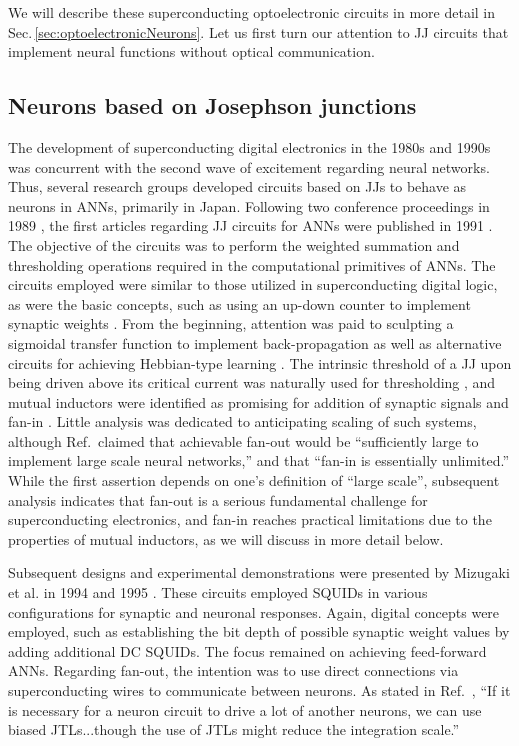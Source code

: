\documentclass[twocolumn]{article}
\newcommand{\onlinecite}[1]{\hspace{-1 ex} \nocite{#1}\citenum{#1}}
\begin{document}
We will describe these superconducting optoelectronic circuits in more detail in Sec.\,\ref{sec:optoelectronicNeurons}. Let us first turn our attention to JJ circuits that implement neural functions without optical communication.

\subsection{Neurons based on Josephson junctions}
The development of superconducting digital electronics in the 1980s and 1990s was concurrent with the second wave of excitement regarding neural networks. Thus, several research groups developed circuits based on JJs to behave as neurons in ANNs, primarily in Japan. Following two conference proceedings in 1989 \cite{ai1989,og1989}, the first articles regarding JJ circuits for ANNs were published in 1991 \cite{hago1991,hiak1991}. The objective of the circuits was to perform the weighted summation and thresholding operations required in the computational primitives of ANNs. The circuits employed were similar to those utilized in superconducting digital logic, as were the basic concepts, such as using an up-down counter to implement synaptic weights \cite{hiak1991}. From the beginning, attention was paid to sculpting a sigmoidal transfer function to implement back-propagation as well as alternative circuits for achieving Hebbian-type learning \cite{hago1991}. The intrinsic threshold of a JJ upon being driven above its critical current was naturally used for thresholding \cite{hago1991}, and mutual inductors were identified as promising for addition of synaptic signals and fan-in \cite{hiak1991}. Little analysis was dedicated to anticipating scaling of such systems, although Ref.\,\onlinecite{hiak1991} claimed that achievable fan-out would be ``sufficiently large to implement large scale neural networks,'' and that ``fan-in is essentially unlimited.'' While the first assertion depends on one's definition of ``large scale'', subsequent analysis indicates that fan-out is a serious fundamental challenge for superconducting electronics, and fan-in reaches practical limitations due to the properties of mutual inductors, as we will discuss in more detail below.

Subsequent designs and experimental demonstrations were presented by Mizugaki et al. in 1994 \cite{mina1994a,mina1994b} and 1995 \cite{mina1995}. These circuits employed SQUIDs in various configurations for synaptic and neuronal responses. Again, digital concepts were employed, such as establishing the bit depth of possible synaptic weight values by adding additional DC SQUIDs. The focus remained on achieving feed-forward ANNs. Regarding fan-out, the intention was to use direct connections via superconducting wires to communicate between neurons. As stated in Ref.\,\onlinecite{mina1994a}, ``If it is necessary for a neuron circuit to drive a lot of another neurons, we can use biased JTLs...though the use of JTLs might reduce the integration scale.'' 
\end{document}
